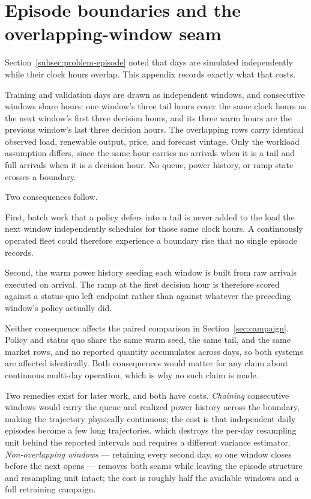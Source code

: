 ﻿\documentclass[12pt]{article}
\begin{document}
\section{Episode boundaries and the overlapping-window seam}
\label{app:episode-seams}

Section~\ref{subsec:problem-episode} noted that days are simulated
independently while their clock hours overlap. This appendix records exactly
what that costs.

Training and validation days are drawn as independent windows, and consecutive
windows share hours: one window's three tail hours cover the same clock hours as
the next window's first three decision hours, and its three warm hours are the
previous window's last three decision hours. The overlapping rows carry
identical observed load, renewable output, price, and forecast vintage. Only
the workload assumption differs, since the same hour carries no arrivals when it
is a tail and full arrivals when it is a decision hour. No queue, power history,
or ramp state crosses a boundary.

Two consequences follow.

First, batch work that a policy defers into a tail is never added to the load
the next window independently schedules for those same clock hours. A
continuously operated fleet could therefore experience a boundary rise that no
single episode records.

Second, the warm power history seeding each window is built from raw arrivals
executed on arrival. The ramp at the first decision hour is therefore scored
against a status-quo left endpoint rather than against whatever the preceding
window's policy actually did.

Neither consequence affects the paired comparison in
Section~\ref{sec:campaign}. Policy and status quo share the same warm seed, the
same tail, and the same market rows, and no reported quantity accumulates across
days, so both systems are affected identically. Both consequences would matter
for any claim about continuous multi-day operation, which is why no such claim
is made.

Two remedies exist for later work, and both have costs. \emph{Chaining}
consecutive windows would carry the queue and realized power history across the
boundary, making the trajectory physically continuous; the cost is that
independent daily episodes become a few long trajectories, which destroys the
per-day resampling unit behind the reported intervals and requires a different
variance estimator. \emph{Non-overlapping windows} --- retaining every second
day, so one window closes before the next opens --- removes both seams while
leaving the episode structure and resampling unit intact; the cost is roughly
half the available windows and a full retraining campaign.
\end{document}
